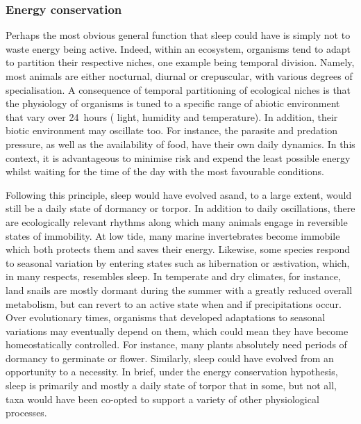 \subsubsection{Energy conservation}
Perhaps the most obvious general function that sleep could have is simply not to waste energy being active.
Indeed, within an ecosystem, organisms tend to adapt to partition their respective niches, one example being temporal division.
Namely, most animals are either nocturnal, diurnal or crepuscular, with various degrees of specialisation.
A consequence of temporal partitioning of ecological niches is that the physiology of organisms is tuned to a specific range of abiotic environment that vary over 24~hours (\eg{} light, humidity and temperature).
In addition, their biotic environment may oscillate too.
For instance, the parasite and predation pressure, as well as the availability of food, have their own daily dynamics. 
In this context, it is advantageous to minimise risk and expend the least possible energy whilst waiting for the time of the day with the most favourable conditions\cite{mignot_why_2008}.

Following this principle, sleep would have evolved as\emd{}and, to a large extent, would still be\emd{} a daily state of dormancy or torpor\cite{siegel_sleep_2009}.
In addition to daily oscillations, there are ecologically relevant rhythms along which many animals engage in reversible states of immobility.
At low tide, many marine invertebrates become immobile which both protects them and saves their energy\cite{mcmahon_respiratory_1988,dahlhoff_physiological_2002,connor_high-resolution_2011}.
Likewise, some species respond to seasonal variation by entering states such as hibernation or æstivation, which, in many respects, resembles sleep\cite{siegel_sleep_2009}. 
In temperate and dry climates, for instance, land snails are mostly dormant during the summer with a greatly reduced overall metabolism\cite{wunnenberg_diurnal_1991, rahman_consequences_2012}, but can revert to an active state when and if precipitations occur. 
Over evolutionary times, organisms that developed adaptations to seasonal variations may eventually depend on them, which could mean they have become homeostatically controlled.
For instance, many plants absolutely need periods of dormancy to germinate or flower\cite{milberg_does_1998,bentsink_seed_2008}.
Similarly, sleep could have evolved from an opportunity to a necessity. 
In brief, under the energy conservation hypothesis, sleep is primarily and mostly a daily state of torpor that in some, but not all, taxa would have been co-opted to support a variety of other physiological processes.

